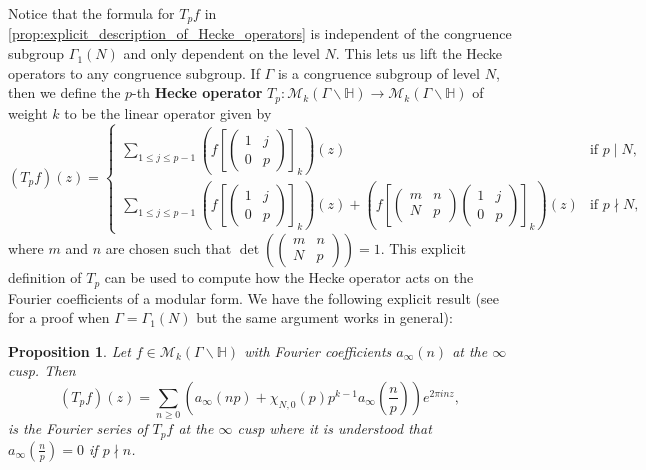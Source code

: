 \documentclass[12pt]{book}
\newtheorem{proposition}{Proposition}[section]
\theoremstyle{definition}\newframedtheorem{method}{Method}
\newcommand{\mc}{\mathcal}
\renewcommand{\H}{\mathbb{H}}
\newcommand{\G}{\Gamma}
\newcommand{\<}{\langle}
\renewcommand{\>}{\rangle}
\newcommand{\GH}{\G\backslash\H}
\begin{document}
      Notice that the formula for $T_{p}f$ in \cref{prop:explicit_description_of_Hecke_operators} is independent of the congruence subgroup $\G_{1}(N)$ and only dependent on the level $N$. This lets us lift the Hecke operators to any congruence subgroup. If $\G$ is a congruence subgroup of level $N$, then we define the $p$-th \textbf{Hecke operator} $T_{p}:\mc{M}_{k}(\GH) \to \mc{M}_{k}(\GH)$ of weight $k$ to be the linear operator given by
      \[
        (T_{p}f)(z) = \begin{cases} \displaystyle\sum_{1 \le j \le p-1}\left(f\left[\begin{pmatrix} 1 & j \\ 0 & p \end{pmatrix}\right]_{k}\right)(z) & \text{if $p \mid N$}, \\ \displaystyle\sum_{1 \le j \le p-1}\left(f\left[\begin{pmatrix} 1 & j \\ 0 & p \end{pmatrix}\right]_{k}\right)(z)+\left(f\left[\begin{pmatrix} m & n \\ N & p \end{pmatrix}\begin{pmatrix} 1 & j \\ 0 & p \end{pmatrix}\right]_{k}\right)(z) & \text{if $p \nmid N$}, \end{cases}
      \]
      where $m$ and $n$ are chosen such that $\det\left(\begin{pmatrix} m & n \\ N & p \end{pmatrix}\right) = 1$. This explicit definition of $T_{p}$ can be used to compute how the Hecke operator acts on the Fourier coefficients of a modular form. We have the following explicit result (see \cite{diamond2005first} for a proof when $\G = \G_{1}(N)$ but the same argument works in general):

      \begin{proposition}\label{prop:prime_Hecke_operators_acting_on_Fourier_coefficients}
        Let $f \in \mc{M}_{k}(\GH)$ with Fourier coefficients $a_{\infty}(n)$ at the $\infty$ cusp. Then
        \[
          (T_{p}f)(z) = \sum_{n \ge 0}\left(a_{\infty}(np)+\chi_{N,0}(p)p^{k-1}a_{\infty}\left(\frac{n}{p}\right)\right)e^{2\pi inz},
        \]
        is the Fourier series of $T_{p}f$ at the $\infty$ cusp where it is understood that $a_{\infty}\left(\frac{n}{p}\right) = 0$ if $p \nmid n$.
      \end{proposition}
\end{document}
